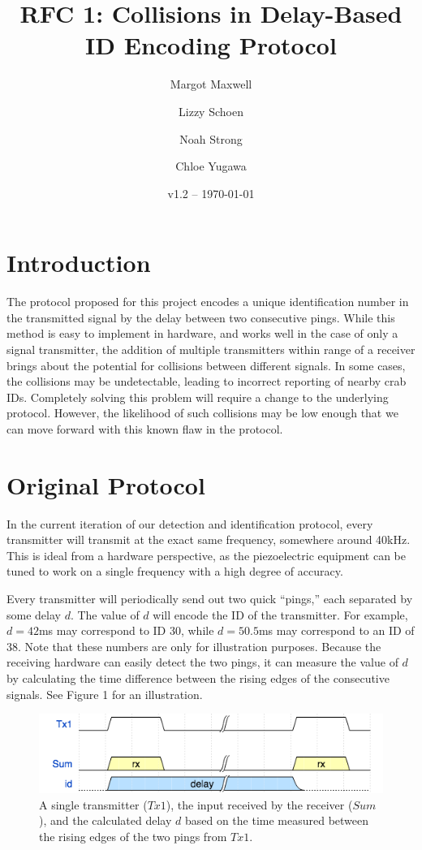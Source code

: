 \documentclass[12pt]{article}
\title{RFC 1: Collisions in Delay-Based ID Encoding Protocol}
\author{
	Margot Maxwell \and
	Lizzy Schoen \and
	Noah Strong \and
	Chloe Yugawa
}
\date{v1.2 -- \today}
\begin{document}
\maketitle

\tableofcontents{}


\section{Introduction}

The protocol proposed for this project encodes a unique identification number
in the transmitted signal by the delay between two consecutive pings.
While this method is easy to implement in hardware, and works well in the case
of only a signal transmitter, the addition of multiple transmitters within range
of a receiver brings about the potential for collisions between different
signals.
In some cases, the collisions may be undetectable, leading to incorrect
reporting of nearby crab IDs.
Completely solving this problem will require a change to the underlying
protocol.
However, the likelihood of such collisions may be low enough that we can move
forward with this known flaw in the protocol.

\section{Original Protocol}

In the current iteration of our detection and identification protocol, every
transmitter will transmit at the exact same frequency, somewhere around
40kHz. This is ideal from a hardware perspective, as the piezoelectric
equipment can be tuned to work on a single frequency with a high degree of
accuracy.

Every transmitter will periodically send out two quick ``pings,'' each separated
by some delay $d$. The value of $d$ will encode the ID of the transmitter.
For example, $d=42$ms may correspond to ID 30, while $d=50.5$ms may
correspond to an ID of 38.
Note that these numbers are only for illustration purposes.
Because the receiving hardware can easily detect the two pings, it can measure
the value of $d$ by calculating the time difference between the rising edges
of the consecutive signals. See Figure 1 for an illustration.

\begin{figure}[h]
\centering
\includegraphics[scale=0.7]{singleTx}

\caption{A single transmitter ($Tx1$), the input received by the receiver
($Sum$), and the calculated delay $d$ based on the time measured between
the rising edges of the two pings from $Tx1$.}
\end{figure}
\end{document}
